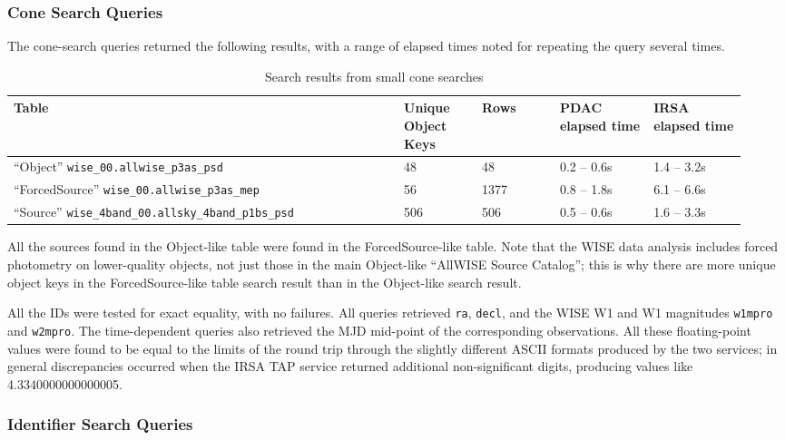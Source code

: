 \subsubsection{Cone Search Queries}

The cone-search queries returned the following results, with a range of elapsed times noted for repeating the query several times.

\begin{table}[h]
\centering
\begin{tabular}{p{0.5 \linewidth} p{0.1 \linewidth} p{0.1 \linewidth} p{0.12 \linewidth} p{0.12 \linewidth}}
Table & Unique Object Keys & Rows & PDAC elapsed time & IRSA elapsed time \\ \hline
``Object'' \verb|wise_00.allwise_p3as_psd| & 48 & 48 & 0.2 -- 0.6s & 1.4 -- 3.2s \\
``ForcedSource'' \verb|wise_00.allwise_p3as_mep| & 56 & 1377 & 0.8 -- 1.8s & 6.1 -- 6.6s \\
``Source'' \verb|wise_4band_00.allsky_4band_p1bs_psd| & 506 & 506 & 0.5 -- 0.6s & 1.6 -- 3.3s \\
\end{tabular}
\caption{Search results from small cone searches}
\label{tab:coneresults}
\end{table}

All the sources found in the Object-like table were found in the ForcedSource-like table.
Note that the WISE data analysis includes forced photometry on lower-quality objects,
not just those in the main Object-like ``AllWISE Source Catalog'';
this is why there are more unique object keys in the ForcedSource-like table search result than in the Object-like search result.

All the IDs were tested for exact equality, with no failures.
All queries retrieved \verb|ra|, \verb|decl|, and the WISE W1 and W1 magnitudes \verb|w1mpro| and \verb|w2mpro|.
The time-dependent queries also retrieved the MJD mid-point of the corresponding observations.
All these floating-point values were found to be equal to the limits of the round trip through the slightly different ASCII formats produced by the two services;
in general discrepancies occurred when the IRSA TAP service returned additional non-significant digits,
producing values like 4.3340000000000005.

\subsubsection{Identifier Search Queries}

